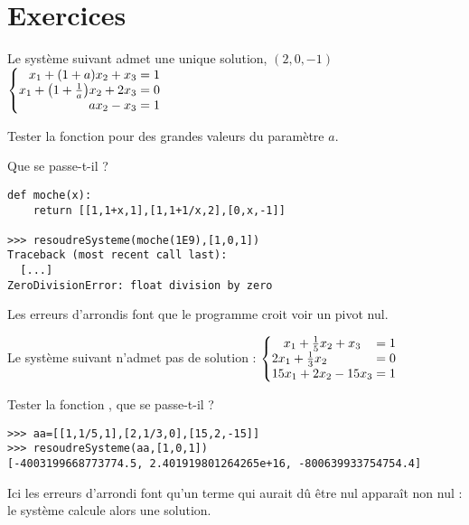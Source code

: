 \section{Exercices}
\begin{Exercise}[title = Perte de l'inversibilité]\it 

Le système suivant admet une unique solution, $(2,0,-1)$
$\left\{
\begin{matrix}\hfill x_1+(1+a)x_2+x_3=1\\
x_1+\bigl(1+ \frac 1a\bigr)x_2+2x_3=0\\
\hfill ax_2-x_3=1\\
\end{matrix}\right.$

Tester la fonction  pour des grandes valeurs du paramètre $a$.

Que se passe-t-il ?
\end{Exercise}
\begin{Answer}
\begin{lstlisting}
def moche(x):
    return [[1,1+x,1],[1,1+1/x,2],[0,x,-1]]

>>> resoudreSysteme(moche(1E9),[1,0,1])
Traceback (most recent call last):
  [...]
ZeroDivisionError: float division by zero
\end{lstlisting}
Les erreurs d'arrondis font que le programme croit voir un pivot nul.
\end{Answer}
\begin{Exercise}[title = Invention d'une solution]\it 

Le système suivant n'admet pas de solution :
$\left\{
\begin{matrix}\hfill x_1+{1 \over 5}x_2+x_3\hfill=1\\
2x_1+{1 \over 3}x_2\hfill=0\\
15x_1+2x_2-15x_3=1\\
\end{matrix}\right.$

Tester la fonction  , que se passe-t-il ?
\end{Exercise}
\begin{Answer}
\begin{lstlisting}
>>> aa=[[1,1/5,1],[2,1/3,0],[15,2,-15]]
>>> resoudreSysteme(aa,[1,0,1])
[-4003199668773774.5, 2.401919801264265e+16, -800639933754754.4]
\end{lstlisting}

Ici les erreurs d'arrondi font qu'un terme qui aurait dû être nul apparaît non nul : le système calcule alors une solution.
\end{Answer}
